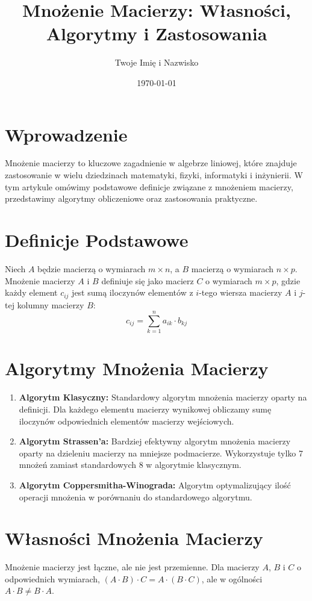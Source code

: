 \documentclass[12pt]{article}
\title{Mnożenie Macierzy: Własności, Algorytmy i Zastosowania}
\author{Twoje Imię i Nazwisko}
\date{\today}
\begin{document}
\maketitle

\section{Wprowadzenie}
Mnożenie macierzy to kluczowe zagadnienie w algebrze liniowej, które znajduje zastosowanie w wielu dziedzinach matematyki, fizyki, informatyki i inżynierii. W tym artykule omówimy podstawowe definicje związane z mnożeniem macierzy, przedstawimy algorytmy obliczeniowe oraz zastosowania praktyczne.

\section{Definicje Podstawowe}
\begin{definition}
Niech $A$ będzie macierzą o wymiarach $m \times n$, a $B$ macierzą o wymiarach $n \times p$. Mnożenie macierzy $A$ i $B$ definiuje się jako macierz $C$ o wymiarach $m \times p$, gdzie każdy element $c_{ij}$ jest sumą iloczynów elementów z $i$-tego wiersza macierzy $A$ i $j$-tej kolumny macierzy $B$:
\[
c_{ij} = \sum_{k=1}^{n} a_{ik} \cdot b_{kj}
\]
\end{definition}

\section{Algorytmy Mnożenia Macierzy}
\begin{enumerate}
  \item \textbf{Algorytm Klasyczny:} Standardowy algorytm mnożenia macierzy oparty na definicji. Dla każdego elementu macierzy wynikowej obliczamy sumę iloczynów odpowiednich elementów macierzy wejściowych.
  
  \item \textbf{Algorytm Strassen'a:} Bardziej efektywny algorytm mnożenia macierzy oparty na dzieleniu macierzy na mniejsze podmacierze. Wykorzystuje tylko 7 mnożeń zamiast standardowych 8 w algorytmie klasycznym.
  
  \item \textbf{Algorytm Coppersmitha-Winograda:} Algorytm optymalizujący ilość operacji mnożenia w porównaniu do standardowego algorytmu.
\end{enumerate}

\section{Własności Mnożenia Macierzy}
\begin{theorem}
Mnożenie macierzy jest łączne, ale nie jest przemienne. Dla macierzy $A$, $B$ i $C$ o odpowiednich wymiarach, $(A \cdot B) \cdot C = A \cdot (B \cdot C)$, ale w ogólności $A \cdot B \neq B \cdot A$.
\end{theorem}
\end{document}
